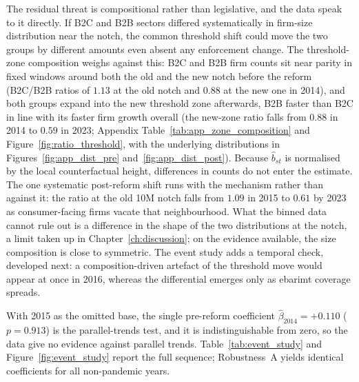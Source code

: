 \documentclass[12pt,oneside,a4paper]{report}
\begin{document}
The residual threat is compositional rather than legislative, and the data speak to it directly. If B2C and B2B sectors differed systematically in firm-size distribution near the notch, the common threshold shift could move the two groups by different amounts even absent any enforcement change. The threshold-zone composition weighs against this: B2C and B2B firm counts sit near parity in fixed windows around both the old and the new notch before the reform (B2C/B2B ratios of $1.13$ at the old notch and $0.88$ at the new one in 2014), and both groups expand into the new threshold zone afterwards, B2B faster than B2C in line with its faster firm growth overall (the new-zone ratio falls from $0.88$ in 2014 to $0.59$ in 2023; Appendix Table~\ref{tab:app_zone_composition} and Figure~\ref{fig:ratio_threshold}, with the underlying distributions in Figures~\ref{fig:app_dist_pre} and~\ref{fig:app_dist_post}). Because $\hat{b}_{st}$ is normalised by the local counterfactual height, differences in counts do not enter the estimate. The one systematic post-reform shift runs with the mechanism rather than against it: the ratio at the old 10M notch falls from $1.09$ in 2015 to $0.61$ by 2023 as consumer-facing firms vacate that neighbourhood. What the binned data cannot rule out is a difference in the shape of the two distributions at the notch, a limit taken up in Chapter~\ref{ch:discussion}; on the evidence available, the size composition is close to symmetric. The event study adds a temporal check, developed next: a composition-driven artefact of the threshold move would appear at once in 2016, whereas the differential emerges only as ebarimt coverage spreads.

With 2015 as the omitted base, the single pre-reform coefficient $\hat{\beta}_{2014} = +0.110$ ($p = 0.913$) is the parallel-trends test, and it is indistinguishable from zero, so the data give no evidence against parallel trends. Table~\ref{tab:event_study} and Figure~\ref{fig:event_study} report the full sequence; Robustness~A yields identical coefficients for all non-pandemic years.
\end{document}
